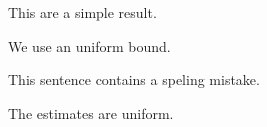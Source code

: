 \documentclass{article}
\begin{document}
This are a simple result.

We use an uniform bound.

This sentence contains a speling mistake.

The estimates are uniform.
\end{document}
